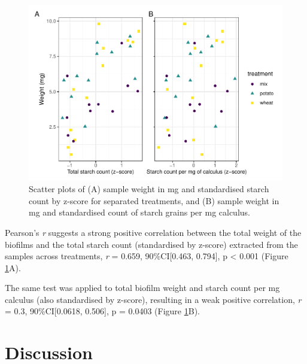 \documentclass[
]{article}
\begin{document}
\begin{figure}

{\centering \includegraphics{../figures/cor-plot-1} 

}

\caption{Scatter plots of (A) sample weight in mg and standardised starch count by z-score for separated treatments, and (B) sample weight in mg and standardised count of starch grains per mg calculus.}\label{fig:cor-plot}
\end{figure}

Pearson's \emph{r} suggests a
strong positive
correlation between the total weight of the biofilms and the total starch count
(standardised by z-score) extracted from the samples across treatments,
\emph{r} = 0.659,
90\%CI{[}0.463, 0.794{]},
p \textless{} 0.001
(Figure \ref{fig:cor-plot}A).

The same test was applied to total biofilm weight and starch count per mg
calculus (also standardised by z-score), resulting in a weak positive correlation,
\emph{r} = 0.3,
90\%CI{[}0.0618, 0.506{]},
p = 0.0403
(Figure \ref{fig:cor-plot}B).

\hypertarget{discussion}{%
\section{Discussion}\label{discussion}}
\end{document}
